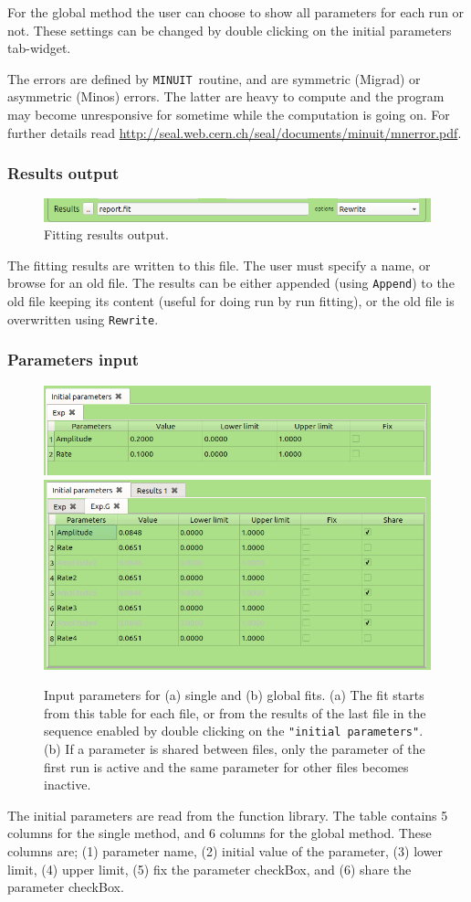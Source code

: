 \documentclass[10pt,letterpaper,oneside]{article}
\newcommand{\minuit}{\texttt{MINUIT}}
\begin{document}
For the global method the user can choose to show all parameters for each run or not. These settings can be changed by double clicking on the initial parameters tab-widget. 

The errors are defined by \minuit\ routine, and are symmetric (Migrad) or asymmetric (Minos) errors. The latter are heavy to compute and the program may become unresponsive for sometime while the computation is going on. For further details read \url{http://seal.web.cern.ch/seal/documents/minuit/mnerror.pdf}.
\subsubsection{Results output}
\begin{figure}[h]
\includegraphics[width=\textwidth]{analyze-res.png}
 \caption{Fitting results output.}
 \label{fig-mag}
 \end{figure}
The fitting results are written to this file. The user must specify a name, or browse for an old file. The results can be either appended
 (using \verb+Append+) to the old file keeping its content (useful for doing run by run fitting), or the old file is overwritten using \verb+Rewrite+. 
\subsubsection{Parameters input}\begin{figure}[h]
\center
\includegraphics[width=.75\textwidth]{analyze-table-s.png}
\includegraphics[width=.75\textwidth]{analyze-table-g.png}
 \caption{Input parameters for (a) single and (b) global fits. (a) The fit starts from this table for each file, or from the results of the last file in the sequence enabled by double clicking on the \texttt{"initial parameters"}. (b) If a parameter is shared between files, only the parameter of the first run is active and the same parameter for other files becomes inactive. }
 \label{fig-tables}
 \end{figure}
The initial parameters are read from the function library.
The table contains 5 columns for the single method, and 6 columns for the global method. These columns are; (1) parameter name, (2) initial value of the parameter, (3) lower limit, (4) upper limit, (5) fix the parameter checkBox, and (6) share the parameter checkBox.
\end{document}
